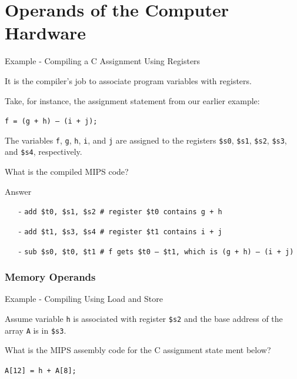 \section{Operands of the Computer Hardware}
\begin{frame}{Example - Compiling a C Assignment Using Registers}
\begin{flushleft}
It is the compiler’s job to associate program variables with registers. 

Take, for instance, the assignment statement from our earlier example:

\hspace{8mm}\texttt{f = (g + h) – (i + j);}

The variables \texttt{f}, \texttt{g}, \texttt{h}, \texttt{i}, and \texttt{j} are assigned to the registers \texttt{\$s0}, \texttt{\$s1}, \texttt{\$s2}, \texttt{\$s3},
and \texttt{\$s4}, respectively. 

What is the compiled MIPS code?
\end{flushleft}
\end{frame}

\begin{frame}[fragile]{Answer}
\begin{itemize}
\item[-]
\texttt{add \$t0, \$s1, \$s2  \# register \$t0 contains g + h}

\item[-]
\texttt{add \$t1, \$s3, \$s4  \# register \$t1 contains i + j}

\item[-]
\texttt{sub \$s0, \$t0, \$t1  \# f gets \$t0 – \$t1, which is (g + h) – (i + j)}
\end{itemize}
\end{frame}

\subsubsection{Memory Operands}
\begin{frame}{Example - Compiling Using Load and Store}
\begin{flushleft}
Assume variable \texttt{h} is associated with register \texttt{\$s2} and the base address of the array \texttt{A} is in \texttt{\$s3}. 

What is the MIPS assembly code for the C assignment state­
ment below?

\hspace{8mm}\texttt{A[12] = h + A[8];}
\end{flushleft}
\end{frame}

